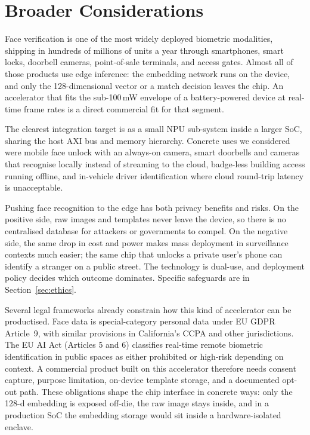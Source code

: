 \section{Broader Considerations}
\label{sec:broader}

Face verification is one of the most widely deployed biometric modalities, shipping in hundreds of millions of units a year through smartphones, smart locks, doorbell cameras, point-of-sale terminals, and access gates. Almost all of those products use edge inference: the embedding network runs on the device, and only the 128-dimensional vector or a match decision leaves the chip. An accelerator that fits the sub-100\,mW envelope of a battery-powered device at real-time frame rates is a direct commercial fit for that segment.

The clearest integration target is as a small NPU sub-system inside a larger SoC, sharing the host AXI bus and memory hierarchy. Concrete uses we considered were mobile face unlock with an always-on camera, smart doorbells and cameras that recognise locally instead of streaming to the cloud, badge-less building access running offline, and in-vehicle driver identification where cloud round-trip latency is unacceptable.

Pushing face recognition to the edge has both privacy benefits and risks. On the positive side, raw images and templates never leave the device, so there is no centralised database for attackers or governments to compel. On the negative side, the same drop in cost and power makes mass deployment in surveillance contexts much easier; the same chip that unlocks a private user's phone can identify a stranger on a public street. The technology is dual-use, and deployment policy decides which outcome dominates. Specific safeguards are in Section~\ref{sec:ethics}.

Several legal frameworks already constrain how this kind of accelerator can be productised. Face data is special-category personal data under EU GDPR Article~9, with similar provisions in California's CCPA and other jurisdictions. The EU AI Act (Articles 5 and 6) classifies real-time remote biometric identification in public spaces as either prohibited or high-risk depending on context. A commercial product built on this accelerator therefore needs consent capture, purpose limitation, on-device template storage, and a documented opt-out path. These obligations shape the chip interface in concrete ways: only the 128-d embedding is exposed off-die, the raw image stays inside, and in a production SoC the embedding storage would sit inside a hardware-isolated enclave.
